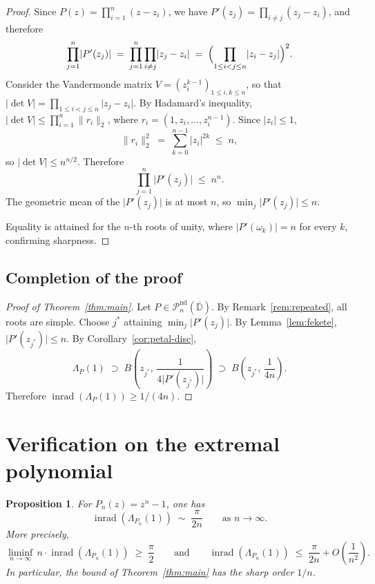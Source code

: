 \documentclass[11pt,a4paper]{amsart}
\newtheorem{proposition}[theorem]{Proposition}
\theoremstyle{definition}
\newcommand{\D}{\mathbb{D}}
\newcommand{\Pn}{\mathcal{P}_n}
\newcommand{\abs}[1]{\lvert #1 \rvert}
\newcommand{\norm}[1]{\lVert #1 \rVert}
\newcommand{\inrad}{\operatorname{inrad}}
\begin{document}
\begin{proof}
Since $P(z) = \prod_{i=1}^n (z - z_i)$, we have
$P'(z_j) = \prod_{i \neq j} (z_j - z_i)$, and therefore
\[
  \prod_{j=1}^n \abs{P'(z_j)}
  \;=\; \prod_{j=1}^n \prod_{i \neq j} \abs{z_j - z_i}
  \;=\; \Bigl(\prod_{1 \leq i < j \leq n} \abs{z_i - z_j}\Bigr)^2.
\]
Consider the Vandermonde matrix $V = (z_i^{k-1})_{1 \leq i,k \leq n}$,
so that $\abs{\det V} = \prod_{1 \leq i < j \leq n}\abs{z_j - z_i}$.
By Hadamard's inequality, $\abs{\det V} \leq \prod_{i=1}^n \norm{r_i}_2$,
where $r_i = (1, z_i, \ldots, z_i^{n-1})$.  Since $\abs{z_i} \leq 1$,
\[
  \norm{r_i}_2^2 \;=\; \sum_{k=0}^{n-1}\abs{z_i}^{2k} \;\leq\; n,
\]
so $\abs{\det V} \leq n^{n/2}$.  Therefore
\[
  \prod_{j=1}^n \abs{P'(z_j)} \;\leq\; n^n.
\]
The geometric mean of the $\abs{P'(z_j)}$ is at most $n$,
so $\min_j \abs{P'(z_j)} \leq n$.

Equality is attained for the $n$-th roots of unity, where
$\abs{P'(\omega_k)} = n$ for every $k$, confirming sharpness.
\end{proof}

\subsection{Completion of the proof}

\begin{proof}[Proof of Theorem~\ref{thm:main}]
Let $P \in \Pn^{\mathrm{nd}}(\overline{\D})$.  By Remark~\ref{rem:repeated},
all roots are simple.  Choose $j^*$ attaining $\min_j \abs{P'(z_j)}$.
By Lemma~\ref{lem:fekete}, $\abs{P'(z_{j^*})} \leq n$.
By Corollary~\ref{cor:petal-disc},
\[
  \Lambda_P(1) \;\supset\;
  B\!\left(z_{j^*},\, \frac{1}{4\abs{P'(z_{j^*})}}\right)
  \;\supset\;
  B\!\left(z_{j^*},\, \frac{1}{4n}\right).
\]
Therefore $\inrad(\Lambda_P(1)) \geq 1/(4n)$.
\end{proof}

\section{Verification on the extremal polynomial}

\begin{proposition}\label{prop:extremal}
For $P_n(z) = z^n - 1$, one has
\[
  \inrad(\Lambda_{P_n}(1)) \;\sim\; \frac{\pi}{2n}
  \qquad\text{as } n \to \infty.
\]
More precisely,
\[
  \liminf_{n \to \infty}\, n \cdot \inrad(\Lambda_{P_n}(1)) \;\geq\; \frac{\pi}{2}
  \qquad\text{and}\qquad
  \inrad(\Lambda_{P_n}(1)) \;\leq\; \frac{\pi}{2n} + O\!\left(\frac{1}{n^2}\right).
\]
In particular, the bound of Theorem~\ref{thm:main} has the sharp order $1/n$.
\end{proposition}
\end{document}
